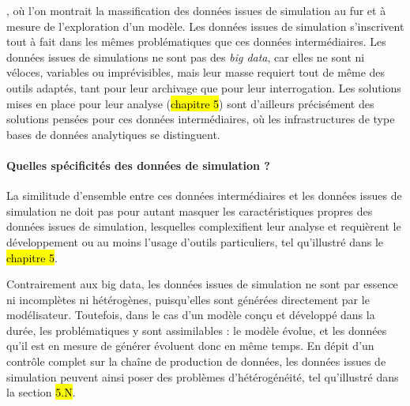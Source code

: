 {	%
}, où l'on montrait la massification des données issues de simulation au fur et à mesure de l'exploration d'un modèle.
Les données issues de simulation s'inscrivent tout à fait dans les mêmes problématiques que ces \og données intermédiaires\fg{}.
Les données issues de simulations ne sont pas des \textit{big data}, car elles ne sont ni véloces, variables ou imprévisibles, mais leur masse requiert tout de même des outils adaptés, tant pour leur archivage que pour leur interrogation.
Les solutions mises en place pour leur analyse (\hl{chapitre 5}) sont d'ailleurs précisément des solutions pensées pour ces données intermédiaires, où les infrastructures de type \og bases de données analytiques\fg{} se distinguent.

\paragraph{Quelles spécificités des données de simulation ?}
La similitude d'ensemble entre ces données intermédiaires et les données issues de simulation ne doit pas pour autant masquer les caractéristiques propres des données issues de simulation, lesquelles complexifient leur analyse et requièrent le développement ou au moins l'usage d'outils particuliers, tel qu'illustré dans le \hl{chapitre 5}.

\noindent Contrairement aux big data, les données issues de simulation ne sont par essence ni incomplètes ni hétérogènes, puisqu'elles sont générées directement par le modélisateur.
Toutefois, dans le cas d'un modèle conçu et développé dans la durée, les problématiques y sont assimilables : le modèle évolue, et les données qu'il est en mesure de générer évoluent donc en même temps.
En dépit d'un contrôle complet sur la chaîne de production de données, les données issues de simulation peuvent ainsi poser des problèmes d'hétérogénéité, tel qu'illustré dans la section \hl{5.N}.

